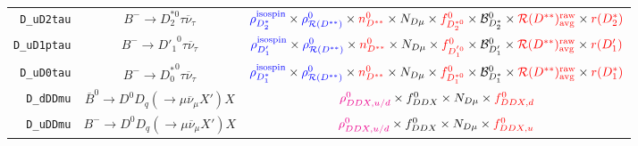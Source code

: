 \begin{landscape}
\begin{table}
\begin{tabular}{r|c|c}
       \texttt{D\_uD2tau} &                 $B^- \rightarrow D_2^{*0} \tau \overline{\nu}_\tau$                  &                        $\textcolor{blue}{\rho^\text{isospin}_{D_2^*}} \times \textcolor{blue}{\rho_{\mathcal{R}(D^{**})}^0} \times \textcolor{red}{n^{0}_{D^{**}}} \times N_{D \mu} \times \textcolor{red}{f^{0}_{D_2^{*0}}} \times \mathcal{B}^{0}_{D_2^*} \times \textcolor{red}{\mathcal{R}(D^{**})_\text{avg}^\text{raw}} \times \textcolor{red}{r({D_2^*})}$                        \\
      \texttt{D\_uD1ptau} &                 $B^- \rightarrow {D'_1}^0 \tau \overline{\nu}_\tau$                  &                         $\textcolor{blue}{\rho^\text{isospin}_{D'_1}} \times \textcolor{blue}{\rho_{\mathcal{R}(D^{**})}^0} \times \textcolor{red}{n^{0}_{D^{**}}} \times N_{D \mu} \times \textcolor{red}{f^{0}_{D_1^{'0}}} \times \mathcal{B}^{0}_{D'_1} \times \textcolor{red}{\mathcal{R}(D^{**})_\text{avg}^\text{raw}} \times \textcolor{red}{r({D'_1})}$                          \\
       \texttt{D\_uD0tau} &                 $B^- \rightarrow {D^*_0}^0 \tau \overline{\nu}_\tau$                 &                        $\textcolor{blue}{\rho^\text{isospin}_{D_1^*}} \times \textcolor{blue}{\rho_{\mathcal{R}(D^{**})}^0} \times \textcolor{red}{n^{0}_{D^{**}}} \times N_{D \mu} \times \textcolor{red}{f^{0}_{D_1^{*0}}} \times \mathcal{B}^{0}_{D_1^*} \times \textcolor{red}{\mathcal{R}(D^{**})_\text{avg}^\text{raw}} \times \textcolor{red}{r({D_1^*})}$                        \\
        \texttt{D\_dDDmu} &    $\overline{B}^0 \rightarrow D^0 D_q (\rightarrow \mu \overline{\nu}_\mu X') X$    &                                                                                                                                      $\textcolor{magenta}{\rho^0_{DDX,u/d}} \times f^0_{DDX} \times N_{D \mu} \times \textcolor{red}{f^0_{DDX,d}}$                                                                                                                                       \\
        \texttt{D\_uDDmu} &         $B^- \rightarrow D^0 D_q (\rightarrow \mu \overline{\nu}_\mu X') X$          &                                                                                                                                      $\textcolor{magenta}{\rho^0_{DDX,u/d}} \times f^0_{DDX} \times N_{D \mu} \times \textcolor{red}{f^0_{DDX,u}}$                                                                                                                                       \\

\end{tabular}
\end{table}
\end{landscape}
